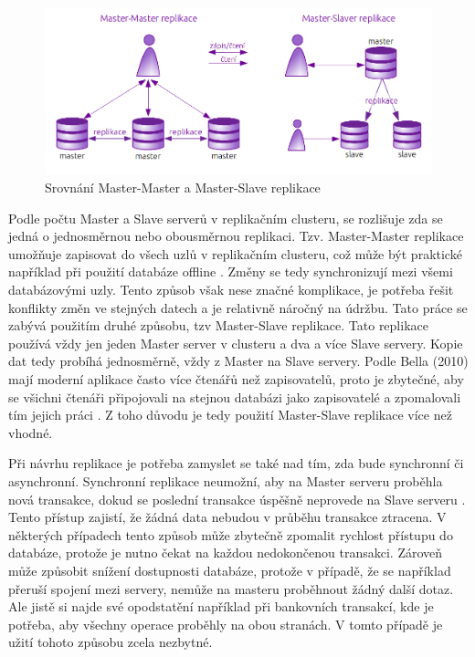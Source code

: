           \begin{figure}[H]
            \centering
            \includegraphics[scale=1]{../../../grafy/obr/schema_masterMasterSlave_maxiTence.png}
            \caption {Srovnání Master-Master a Master-Slave replikace}
            \label{srovnaniM-M-S}
          \end{figure}

Podle počtu Master a Slave serverů v replikačním clusteru, se rozlišuje zda se jedná o jednosměrnou nebo obousměrnou replikaci. Tzv. Master-Master replikace umožňuje zapisovat do všech uzlů v replikačním clusteru, což může být praktické například při použití databáze offline . Změny se tedy synchronizují mezi všemi databázovými uzly. Tento způsob však nese značné komplikace, je potřeba řešit konflikty změn ve stejných datech a je relativně náročný na údržbu. Tato práce se zabývá použitím druhé způsobu, tzv Master-Slave replikace. Tato replikace používá vždy jen jeden Master server v clusteru a dva a více Slave servery. Kopie dat tedy probíhá jednosměrně, vždy z Master na Slave servery. Podle Bella (2010) mají moderní aplikace často více čtenářů než zapisovatelů, proto je zbytečné, aby se všichni čtenáři připojovali na stejnou databázi jako zapisovatelé a zpomalovali tím jejich práci \citep{BellKindahlThalmann2010}. Z toho důvodu je tedy použití Master-Slave replikace více než vhodné.

Při návrhu replikace je potřeba zamyslet se také nad tím, zda bude synchronní či asynchronní. Synchronní replikace neumožní, aby na Master serveru proběhla nová transakce, dokud se poslední transakce úspěšně neprovede na Slave serveru \citep{Boszormenyi2013}. Tento přístup zajistí, že žádná data nebudou v průběhu transakce ztracena. V některých případech tento způsob může zbytečně zpomalit rychlost přístupu do databáze, protože je nutno čekat na každou nedokončenou transakci. Zároveň může způsobit snížení dostupnosti databáze, protože v případě, že se například přeruší spojení mezi servery, nemůže na masteru proběhnout žádný další dotaz. Ale jistě si najde své opodstatění například při bankovních transakcí, kde je potřeba, aby všechny operace proběhly na obou stranách. V tomto případě je užití tohoto způsobu zcela nezbytné. 

